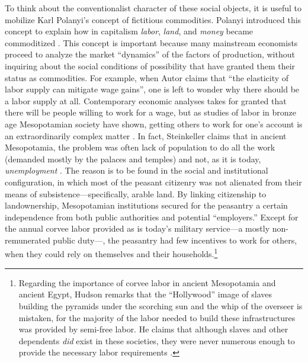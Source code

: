 \documentclass[version=last,draft=false,paper=A4,portrait,twoside=true,twocolumn=false,headinclude=false,footinclude=false,mpinclude=true,fontsize=12,BCOR=20mm,DIV=calc,pagesize=auto,open=right,chapterprefix=true,numbers=autoendperiod,headsepline=false,headings=twolinechapter,parskip=false]{scrbook}
\begin{document}
To think about the conventionalist character of these social objects, it is
 useful to mobilize Karl Polanyi's concept of fictitious commodities.
 Polanyi introduced this concept to explain how in capitalism \emph{labor}, \emph{land},
 and \emph{money} became commoditized \autocite{polanyi1944_2001}. This concept is
 important because many mainstream economists proceed to analyze the market
 ``dynamics'' of the factors of production, without inquiring about the
 social conditions of possibility that have granted them their status as
 commodities. For example, when Autor claims that ``the elasticity of labor
 supply can mitigate wage gains'', one is left to wonder why there should
 be a labor supply at all. Contemporary economic analyses takes for granted
 that there will be people willing to work for a wage, but as studies of
 labor in bronze age Mesopotamian society have shown, getting others to
 work for one's account is an extraordinarily complex matter
 \autocite[5]{steinkeller2015}. In fact, Steinkeller claims that in
 ancient Mesopotamia, the problem was often lack of population to do all
 the work (demanded mostly by the palaces and temples) and not, as it is
 today, \emph{unemployment} \autocite[9--19]{steinkeller2015}. The reason is
 to be found in the social and institutional configuration, in which most
 of the peasant citizenry was not alienated from their means of
 subsistence---specifically, arable land. By linking citizenship to
 landownership, Mesopotamian institutions secured for the peasantry a
 certain independence from both public authorities and potential
 ``employers.'' Except for the annual corvee labor provided as is today's
 military service---a mostly non-remunerated public duty---, the peasantry
 had few incentives to work for others, when they could rely on themselves
 and their households.\footnote{Regarding the importance of corvee labor in ancient Mesopotamia and
ancient Egypt, Hudson remarks that the ``Hollywood'' image of slaves
building the pyramids under the scorching sun and the whip of the overseer
is mistaken, for the majority of the labor needed to build these
infrastructures was provided by semi-free labor. He claims that although
slaves and other dependents \emph{did} exist in these societies, they were never
numerous enough to provide the necessary labor requirements
\autocite[649]{hudson2015}.}
\end{document}
